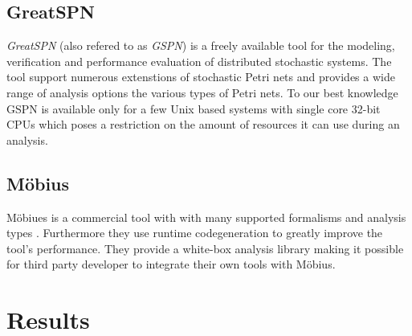 \subsection{GreatSPN}

\emph{GreatSPN} (also refered to as \emph{GSPN}) \citep{baarir2009greatspn} is a freely available tool for the modeling, verification and performance evaluation of distributed stochastic systems. The tool support numerous extenstions of stochastic Petri nets and provides a wide range of analysis options the various types of Petri nets. To our best knowledge GSPN is available only for a few Unix based systems with single core 32-bit CPUs which poses a restriction on the amount of resources it can use during an analysis.

\subsection{Möbius}

Möbiues is a commercial tool with with many supported formalisms and analysis types \citep{courtney2009mobius}. Furthermore they use runtime codegeneration to greatly improve the tool's performance. They provide a white-box analysis library making it possible for third party developer to integrate their own tools with Möbius.

\section{Results}
\label{sec:evaluation:results}

